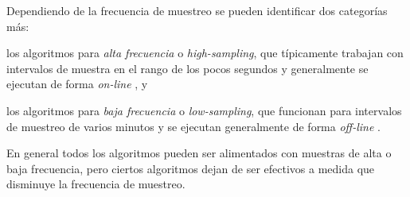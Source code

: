 Dependiendo de la frecuencia de muestreo se pueden identificar dos categorías más: \begin{enumerate*}[1)] \item los algoritmos para \emph{alta frecuencia} o \emph{high-sampling}, que típicamente trabajan con intervalos de muestra en el rango de los pocos segundos y generalmente se ejecutan de forma \emph{on-line} \cite{greenfeld2002matching,quddus2003general,quddus2006high}, y \item los algoritmos para \emph{baja frecuencia} o \emph{low-sampling},  que funcionan para intervalos de muestreo de varios minutos y se ejecutan generalmente de forma \emph{off-line} \cite{lou2009map,yuan2010interactive}. \end{enumerate*} En general todos los algoritmos pueden ser alimentados con muestras de alta o baja frecuencia, pero ciertos algoritmos dejan de ser efectivos a medida que disminuye la frecuencia de muestreo.